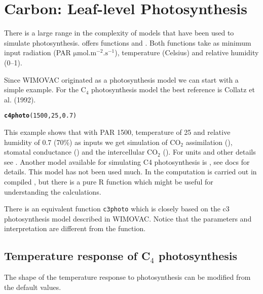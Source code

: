 \documentclass[12pt]{article}\usepackage[]{graphicx}\usepackage[]{color}
\makeatletter
\newcommand{\hlnum}[1]{\textcolor[rgb]{0.686,0.059,0.569}{#1}}%
\newcommand{\hlstd}[1]{\textcolor[rgb]{0.345,0.345,0.345}{#1}}%
\newcommand{\hlkwd}[1]{\textcolor[rgb]{0.737,0.353,0.396}{\textbf{#1}}}%
\newenvironment{kframe}{%
 \def\at@end@of@kframe{}%
 \ifinner\ifhmode%
  \def\at@end@of@kframe{\end{minipage}}%
  \begin{minipage}{\columnwidth}%
 \fi\fi%
 \def\FrameCommand##1{\hskip\@totalleftmargin \hskip-\fboxsep
 \colorbox{shadecolor}{##1}\hskip-\fboxsep
     \hskip-\linewidth \hskip-\@totalleftmargin \hskip\columnwidth}%
 \MakeFramed {\advance\hsize-\width
   \@totalleftmargin\z@ \linewidth\hsize
   \@setminipage}}%
 {\par\unskip\endMakeFramed%
 \at@end@of@kframe}
\newenvironment{knitrout}{}{} %
\makeatother
\begin{document}
\section{Carbon: Leaf-level Photosynthesis}
 
There is a large range in the complexity of models that have been used
to simulate photosynthesis.  offers functions
 and . Both functions take as minimum
input radiation (PAR $\si{\micro\mol.\meter^{-2}.\second^{-1}}$),
temperature (Celsius) and relative humidity (0--1).

Since WIMOVAC originated as a photosynthesis model we can start with a
simple example. For the C$_4$ photosynthesis model the best reference
is Collatz et al. (1992). 

\begin{knitrout}
\color{fgcolor}\begin{kframe}
\begin{alltt}
\hlkwd{c4photo}\hlstd{(}\hlnum{1500}\hlstd{,}\hlnum{25}\hlstd{,}\hlnum{0.7}\hlstd{)}
\end{alltt}
\end{kframe}
\end{knitrout}

This example shows that with PAR 1500, temperature of 25 and relative
humidity of 0.7 (70\%) as inputs we get simulation of CO$_2$
assimilation (), stomatal conductance () and the
intercellular CO$_2$ (). For units and other details see
. Another model available for simulating C4
photosynthesis is , see docs for details. This model
has not been used much. In  the computation is carried
out in compiled , but there is a pure R function
 which might be useful for understanding the
calculations.

There is an equivalent function \texttt{c3photo} which is closely
based on the c3 photosynthesis model described in WIMOVAC. Notice that
the parameters and interpretation are different from the
 function. 




\subsection{Temperature response of C$_4$ photosynthesis}

The shape of the temperature response to photosynthesis can be
modified from the default values.
\end{document}
